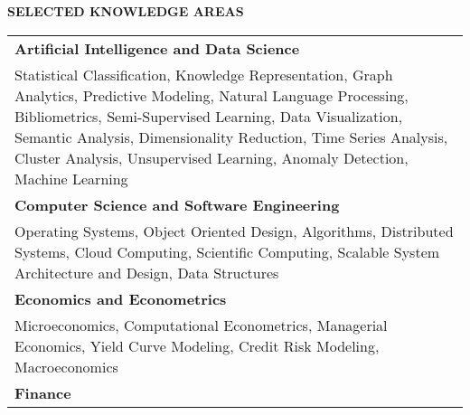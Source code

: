 \documentclass[10pt, letterpaper]{letter}
\newcommand{\highlightcolor}{RoyalBlue}
\newcommand{\sectionTitle}[1]{ \vspace{1em} \raggedright{ \color{\highlightcolor} \large \textbf{ \uppercase{ #1}}}}
\begin{document}


    \sectionTitle{Selected Knowledge Areas}

    \begin{tabularx}{\textwidth}{X}
        
            \textbf{Artificial Intelligence and Data Science} \\
            
            Statistical Classification, 
            Knowledge Representation, 
            Graph Analytics, 
            Predictive Modeling, 
            Natural Language Processing, 
            Bibliometrics, 
            Semi-Supervised Learning, 
            Data Visualization, 
            Semantic Analysis, 
            Dimensionality Reduction, 
            Time Series Analysis, 
            Cluster Analysis, 
            Unsupervised Learning, 
            Anomaly Detection, 
            Machine Learning \\
        
            \textbf{Computer Science and Software Engineering} \\
            
            Operating Systems, 
            Object Oriented Design, 
            Algorithms, 
            Distributed Systems, 
            Cloud Computing, 
            Scientific Computing, 
            Scalable System Architecture and Design, 
            Data Structures \\
        
            \textbf{Economics and Econometrics} \\
            
            Microeconomics, 
            Computational Econometrics, 
            Managerial Economics, 
            Yield Curve Modeling, 
            Credit Risk Modeling, 
            Macroeconomics \\
        
            \textbf{Finance} \\
            

\end{tabularx}
\end{document}
